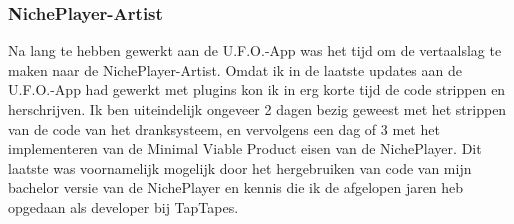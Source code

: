 \subsubsection*{NichePlayer-Artist}
Na lang te hebben gewerkt aan de U.F.O.-App was het tijd om de vertaalslag te maken naar de NichePlayer-Artist. Omdat ik in de laatste updates aan de U.F.O.-App had gewerkt met plugins kon ik in erg korte tijd de code strippen en herschrijven. Ik ben uiteindelijk ongeveer 2 dagen bezig geweest met het strippen van de code van het dranksysteem, en vervolgens een dag of 3 met het implementeren van de Minimal Viable Product eisen van de NichePlayer. Dit laatste was voornamelijk mogelijk door het hergebruiken van code van mijn bachelor versie van de NichePlayer en kennis die ik de afgelopen jaren heb opgedaan als developer bij TapTapes.


